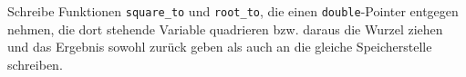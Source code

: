 \begin{aufg}
Schreibe Funktionen \verb|square_to| und \verb|root_to|, die einen \verb|double|-Pointer entgegen nehmen, die dort stehende Variable quadrieren bzw. daraus die Wurzel ziehen und das Ergebnis sowohl zurück geben als auch an die gleiche Speicherstelle schreiben.
\end{aufg}